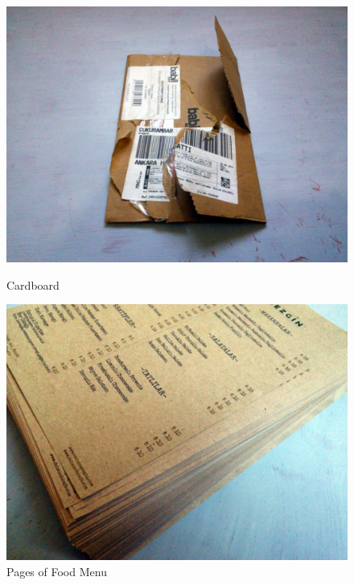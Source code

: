 \begin{figure}[!tbp]
  \centering
  \begin{minipage}[b]{0.48\textwidth}
    \includegraphics[width=\textwidth]{project_graphics/collected_cardboard.jpg}
    \caption{Cardboard}
    \label{fig:CardBoard}
  \end{minipage}
  \hfill
  \begin{minipage}[b]{0.48\textwidth}
    \includegraphics[width=\textwidth]{project_graphics/collected_varuna_gezgin.jpg}
    \caption{Pages of Food Menu}
    \label{fig:VarunaGezgin}
  \end{minipage}
\end{figure}


